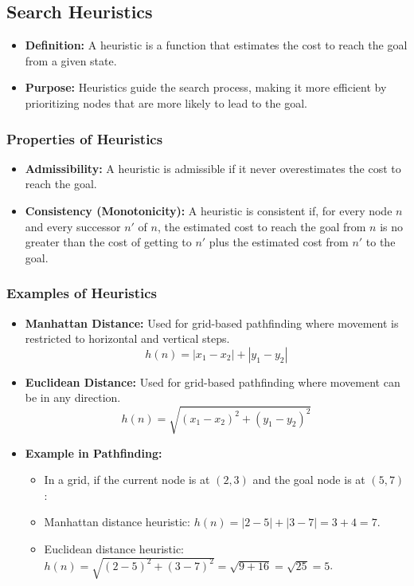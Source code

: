 \documentclass[8pt]{article}
\begin{document}
\subsection{Search Heuristics}
\begin{itemize}
    \item \textbf{Definition:} A heuristic is a function that estimates the cost to reach the goal from a given state.
    \item \textbf{Purpose:} Heuristics guide the search process, making it more efficient by prioritizing nodes that are more likely to lead to the goal.
\end{itemize}

\subsubsection{Properties of Heuristics}
\begin{itemize}
    \item \textbf{Admissibility:} A heuristic is admissible if it never overestimates the cost to reach the goal.
    \item \textbf{Consistency (Monotonicity):} A heuristic is consistent if, for every node \(n\) and every successor \(n'\) of \(n\), the estimated cost to reach the goal from \(n\) is no greater than the cost of getting to \(n'\) plus the estimated cost from \(n'\) to the goal.
\end{itemize}

\subsubsection{Examples of Heuristics}
\begin{itemize}
    \item \textbf{Manhattan Distance:} Used for grid-based pathfinding where movement is restricted to horizontal and vertical steps.
    \[
    h(n) = |x_1 - x_2| + |y_1 - y_2|
    \]
    \item \textbf{Euclidean Distance:} Used for grid-based pathfinding where movement can be in any direction.
    \[
    h(n) = \sqrt{(x_1 - x_2)^2 + (y_1 - y_2)^2}
    \]
    \item \textbf{Example in Pathfinding:} 
    \begin{itemize}
        \item In a grid, if the current node is at \((2, 3)\) and the goal node is at \((5, 7)\):
        \item Manhattan distance heuristic: \(h(n) = |2 - 5| + |3 - 7| = 3 + 4 = 7\).
        \item Euclidean distance heuristic: \(h(n) = \sqrt{(2 - 5)^2 + (3 - 7)^2} = \sqrt{9 + 16} = \sqrt{25} = 5\).
    \end{itemize}
\end{itemize}
\end{document}
